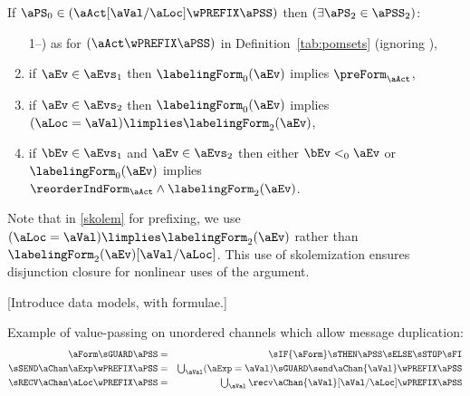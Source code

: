 \begin{definition}
  \noindent
  If $\aPS_0 \in (\aAct[\aVal/\aLoc]\wPREFIX\aPSS)$ then
  $(\exists\aPS_2\in\aPSS_2)$:
  \begin{enumerate}
     \setcounter{enumi}{\value{pomsetPrefixXount}}
  \item[1--\thepomsetPrefixXount)] as for $(\aAct\wPREFIX\aPSS)$ in Definition~\ref{tab:pomsets} (ignoring \thepomsetPrefixOrderXount),
  \item if $\aEv\in\aEvs_1$ then $\labelingForm_0(\aEv)$ implies $\preForm_\aAct$,
  \item\label{skolem} if $\aEv\in\aEvs_2$ then $\labelingForm_0(\aEv)$ implies $(\aLoc=\aVal) \limplies \labelingForm_2(\aEv)$,
  \item if $\bEv\in\aEvs_1$ and $\aEv\in\aEvs_2$ then either $\bEv<_0\aEv$ or\\ 
    $\labelingForm_0(\aEv)$ implies $\reorderIndForm_\aAct\land\labelingForm_2(\aEv)$.
  \end{enumerate}
\label{tab:pomsets-pre}
\end{definition}

\begin{remark}
Note that in \ref{skolem} for prefixing, we use
$(\aLoc=\aVal) \limplies \labelingForm_2(\aEv)$ rather than
$\labelingForm_2(\aEv) [\aVal/\aLoc]$.
This use of skolemization  ensures disjunction closure for nonlinear uses of
the argument.



\end{remark}

[Introduce data models, with formulae.]

Example of value-passing on unordered channels which allow
message duplication:
\begin{eqnarray*}
  \aForm\sGUARD\aPSS & = &
  \sIF{\aForm}\sTHEN\aPSS\sELSE\sSTOP\sFI
\\
  \sSEND\aChan\aExp\wPREFIX\aPSS & = &
  \textstyle\bigcup_\aVal (\aExp=\aVal) \sGUARD \send\aChan{\aVal} \wPREFIX \aPSS
\\
  \sRECV\aChan\aLoc\wPREFIX\aPSS & = &
  \textstyle\bigcup_\aVal \recv\aChan{\aVal}[\aVal/\aLoc] \wPREFIX \aPSS
\end{eqnarray*}

